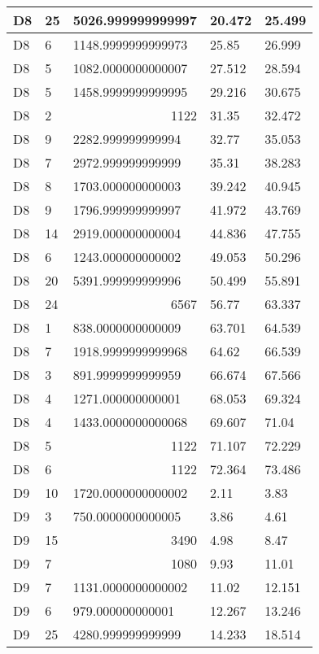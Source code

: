 \begin{longtable}{|l|l|l|l|l|}
D8 & 25 & 5026.999999999997 & 20.472 & 25.499 \\ \hline
D8 & 6 & 1148.9999999999973 & 25.85 & 26.999 \\ \hline
D8 & 5 & 1082.0000000000007 & 27.512 & 28.594 \\ \hline
D8 & 5 & 1458.9999999999995 & 29.216 & 30.675 \\ \hline
D8 & 2 & \multicolumn{1}{r|}{1122} & 31.35 & 32.472 \\ \hline
D8 & 9 & 2282.999999999994 & 32.77 & 35.053 \\ \hline
D8 & 7 & 2972.999999999999 & 35.31 & 38.283 \\ \hline
D8 & 8 & 1703.000000000003 & 39.242 & 40.945 \\ \hline
D8 & 9 & 1796.999999999997 & 41.972 & 43.769 \\ \hline
D8 & 14 & 2919.000000000004 & 44.836 & 47.755 \\ \hline
D8 & 6 & 1243.000000000002 & 49.053 & 50.296 \\ \hline
D8 & 20 & 5391.999999999996 & 50.499 & 55.891 \\ \hline
D8 & 24 & \multicolumn{1}{r|}{6567} & 56.77 & 63.337 \\ \hline
D8 & 1 & 838.0000000000009 & 63.701 & 64.539 \\ \hline
D8 & 7 & 1918.9999999999968 & 64.62 & 66.539 \\ \hline
D8 & 3 & 891.9999999999959 & 66.674 & 67.566 \\ \hline
D8 & 4 & 1271.000000000001 & 68.053 & 69.324 \\ \hline
D8 & 4 & 1433.0000000000068 & 69.607 & 71.04 \\ \hline
D8 & 5 & \multicolumn{1}{r|}{1122} & 71.107 & 72.229 \\ \hline
D8 & 6 & \multicolumn{1}{r|}{1122} & 72.364 & 73.486 \\ \hline
D9 & 10 & 1720.0000000000002 & 2.11 & 3.83 \\ \hline
D9 & 3 & 750.0000000000005 & 3.86 & 4.61 \\ \hline
D9 & 15 & \multicolumn{1}{r|}{3490} & 4.98 & 8.47 \\ \hline
D9 & 7 & \multicolumn{1}{r|}{1080} & 9.93 & 11.01 \\ \hline
D9 & 7 & 1131.0000000000002 & 11.02 & 12.151 \\ \hline
D9 & 6 & 979.000000000001 & 12.267 & 13.246 \\ \hline
D9 & 25 & 4280.999999999999 & 14.233 & 18.514 \\ \hline

\end{longtable}
